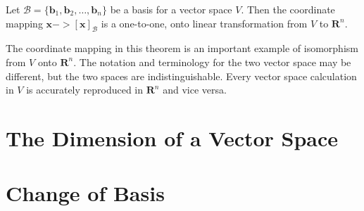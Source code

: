\documentclass[../linalg.tex]{subfiles}
\begin{document}
\begin{theorem}
    Let $\mathcal{B}=\{\textbf{b}_1,\textbf{b}_2,\dots,\textbf{b}_n\}$ be a basis for a vector space $V$. Then the coordinate mapping $\textbf{x} -> [\textbf{x}]_{\mathcal{B}}$ is a one-to-one, onto linear transformation from $V$ to $\textbf{R}^n$.
\end{theorem}

The coordinate mapping in this theorem is an important example of isomorphism from $V$ onto $\textbf{R}^n$. The notation and terminology for the two vector space may be different, but the two spaces are indistinguishable. Every vector space calculation in $V$ is accurately reproduced in $\textbf{R}^n$ and vice versa.




\section{The Dimension of a Vector Space}
\section{Change of Basis}
\end{document}
